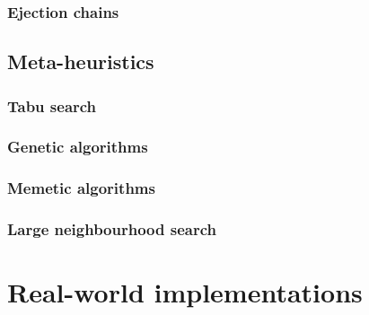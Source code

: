 \subsubsection{Ejection chains}


\subsection{Meta-heuristics}

\subsubsection{Tabu search}

\subsubsection{Genetic algorithms}

\subsubsection{Memetic algorithms}

\subsubsection{Large neighbourhood search}


\section{Real-world implementations}




